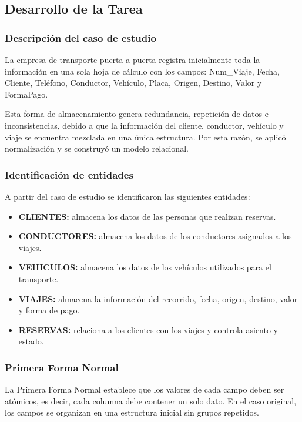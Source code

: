 \documentclass{article}
\begin{document}
\subsection{Desarrollo de la Tarea}

\subsubsection{Descripción del caso de estudio}

La empresa de transporte puerta a puerta registra inicialmente toda la información en una sola hoja de cálculo con los campos: Num\_Viaje, Fecha, Cliente, Teléfono, Conductor, Vehículo, Placa, Origen, Destino, Valor y FormaPago.

Esta forma de almacenamiento genera redundancia, repetición de datos e inconsistencias, debido a que la información del cliente, conductor, vehículo y viaje se encuentra mezclada en una única estructura. Por esta razón, se aplicó normalización y se construyó un modelo relacional.

\subsubsection{Identificación de entidades}

A partir del caso de estudio se identificaron las siguientes entidades:

\begin{itemize}
    \item \textbf{CLIENTES:} almacena los datos de las personas que realizan reservas.
    \item \textbf{CONDUCTORES:} almacena los datos de los conductores asignados a los viajes.
    \item \textbf{VEHICULOS:} almacena los datos de los vehículos utilizados para el transporte.
    \item \textbf{VIAJES:} almacena la información del recorrido, fecha, origen, destino, valor y forma de pago.
    \item \textbf{RESERVAS:} relaciona a los clientes con los viajes y controla asiento y estado.
\end{itemize}

\subsubsection{Primera Forma Normal}

La Primera Forma Normal establece que los valores de cada campo deben ser atómicos, es decir, cada columna debe contener un solo dato. En el caso original, los campos se organizan en una estructura inicial sin grupos repetidos.
\end{document}
